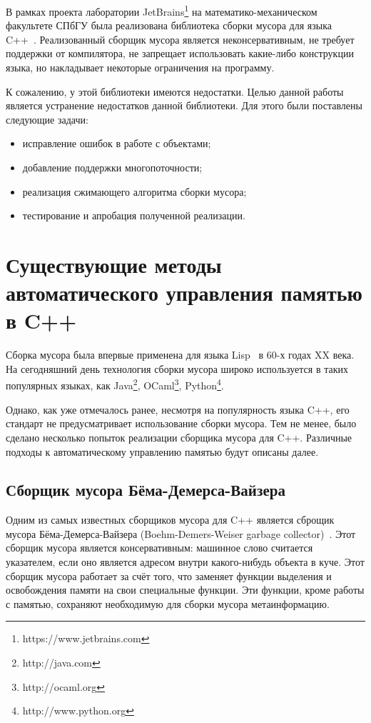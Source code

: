 В рамках проекта лаборатории JetBrains\footnote{https://www.jetbrains.com} на математико-механическом факультете СПбГУ
была реализована библиотека сборки мусора для языка C++~\cite{berezun}. 
Реализованный сборщик мусора является неконсервативным, не требует поддержки от компилятора, не запрещает использовать какие-либо конструкции языка, но накладывает некоторые ограничения на программу.

К сожалению, у этой библиотеки имеются недостатки. Целью данной работы является устранение недостатков данной библиотеки. Для этого были поставлены следующие задачи: 
\begin{itemize}
\item исправление ошибок в работе с объектами; 
\item добавление поддержки многопоточности;
\item реализация сжимающего алгоритма сборки мусора;
\item тестирование и апробация полученной реализации.
\end{itemize}


\section{Существующие методы автоматического управления памятью в C++}
Сборка мусора была впервые применена для языка Lisp~\cite{lisp} в 60-х годах XX века. На сегодняшний день технология сборки мусора широко используется в таких популярных языках, как Java\footnote{http://java.com}, OCaml\footnote{http://ocaml.org}, Python\footnote{http://www.python.org}.

Однако, как уже отмечалось ранее, несмотря на популярность языка C++, его стандарт не предусматривает использование сборки мусора. Тем не менее, было сделано несколько попыток реализации сборщика мусора для C++. Различные подходы к автоматическому управлению памятью будут описаны далее.

\subsection{Сборщик мусора Бёма-Демерса-Вайзера}
Одним из самых известных сборщиков мусора для C++ является сброщик мусора Бёма-Демерса-Вайзера (Boehm-Demers-Weiser garbage collector)~\cite{boehm1, boehm2, boehm3}. Этот сборщик мусора является консервативным: машинное слово считается указателем, если оно является адресом внутри какого-нибудь объекта в куче. Этот сборщик мусора работает за счёт того, что заменяет функции выделения и освобождения памяти на свои специальные функции. Эти функции, кроме работы с памятью, сохраняют необходимую для сборки мусора метаинформацию.

